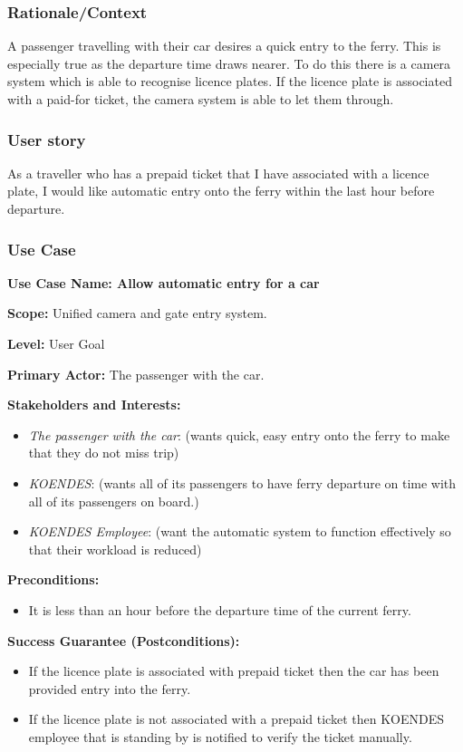 \subsubsection{Rationale/Context}
A passenger travelling with their car desires a quick entry to the ferry. This is especially true as the departure time draws nearer. To do this there is a camera system which is able to recognise licence plates. If the licence plate is associated with a paid-for ticket, the camera system is able to let them through.   
\subsubsection{User story}

As a traveller who has a prepaid ticket that I have associated with a licence plate, I would like automatic entry onto the ferry within the last hour before departure.  
\subsubsection{Use Case}
\creator{\studentB}


\textbf{Use Case Name: Allow automatic entry for a car} 

\textbf{Scope:} Unified camera and gate entry system.

\textbf{Level:} User Goal

\textbf{Primary Actor:} The passenger with the car.

\textbf{Stakeholders and Interests:} 
\begin{itemize}
\item \textit{The passenger with the car}: (wants quick, easy entry onto the ferry to make that they do not miss trip)
\item \textit{KOENDES}: (wants all of its passengers to have ferry departure on time with all of its passengers on board.)
\item \textit{KOENDES Employee}: (want the automatic system to function effectively so that their workload is reduced)
\end{itemize}
\textbf{Preconditions:} 
\begin{itemize}
\item It is less than an hour before the departure time of the current ferry.
\end{itemize}

\textbf{Success Guarantee (Postconditions):} 
\begin{itemize}
\item If the licence plate is associated with prepaid ticket then the car has been provided entry into the ferry.
\item If the licence plate is not associated with a prepaid ticket then KOENDES employee that is standing by is notified to verify the ticket manually. 
\end{itemize}

